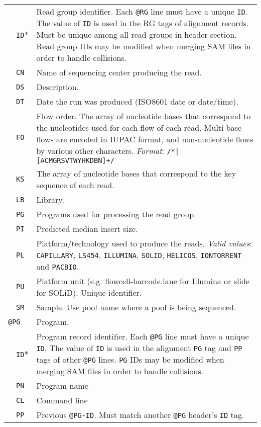 \documentclass[10pt]{article}
\begin{document}
\begin{center}
\begin{longtable}{|l|l|p{13.5cm}|}
  & {\tt ID}* & Read group identifier. Each {\tt @RG} line must have a unique {\tt ID}. The value of {\tt ID}
  is used in the RG tags of alignment records. Must be unique among all read groups in header section.  Read group IDs may be modified when merging SAM files in order to handle collisions.\\\cline{2-3}
  & {\tt CN} & Name of sequencing center producing the read.\\\cline{2-3}
  & {\tt DS} & Description.\\\cline{2-3}
  & {\tt DT} & Date the run was produced (ISO8601 date or date/time).\\\cline{2-3}
  & {\tt FO} & Flow order. The array of nucleotide bases that correspond to the nucleotides used for each flow of each read.
  	Multi-base flows are encoded in IUPAC format, and non-nucleotide flows by various other characters. \emph{Format}: {\tt /\char92*|[ACMGRSVTWYHKDBN]+/}\\\cline{2-3}
  & {\tt KS} & The array of nucleotide bases that correspond to the key sequence of each read.\\\cline{2-3}
  & {\tt LB} & Library.\\\cline{2-3}
  & {\tt PG} & Programs used for processing the read group.\\\cline{2-3}
  & {\tt PI} & Predicted median insert size.\\\cline{2-3}
  & {\tt PL} & Platform/technology used to produce the reads. \emph{Valid values}:
  {\tt CAPILLARY}, {\tt LS454}, {\tt ILLUMINA}, {\tt SOLID}, {\tt HELICOS}, {\tt IONTORRENT} and {\tt PACBIO}.\\\cline{2-3}
  & {\tt PU} & Platform unit (e.g. flowcell-barcode.lane for Illumina or slide for SOLiD). Unique identifier.\\\cline{2-3}
  & {\tt SM} & Sample. Use pool name where a pool is being sequenced.\\\cline{1-3}
  \multicolumn{2}{|l}{\tt @PG} & Program. \\\cline{2-3}
  & {\tt ID}* & Program record identifier. Each {\tt @PG} line must have a unique {\tt ID}.
  	The value of {\tt ID} is used in the alignment {\tt PG} tag and {\tt PP} tags of other {\tt @PG} lines.
	{\tt PG} IDs may be modified when merging SAM files in order to handle collisions.\\\cline{2-3}
  & {\tt PN} & Program name \\\cline{2-3}
  & {\tt CL} & Command line \\\cline{2-3}
  & {\tt PP} & Previous {\tt @PG-ID}. Must match another {\tt @PG} header's {\tt ID} tag.

\end{longtable}
\end{center}
\end{document}
